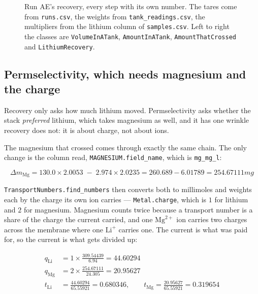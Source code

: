 \begin{figure}[htbp]
\caption{Run AE's recovery, every step with its own number. The tares come from
\texttt{runs.csv}, the weights from \texttt{tank\_readings.csv}, the multipliers from the
lithium column of \texttt{samples.csv}. Left to right the classes are
\texttt{VolumeInATank}, \texttt{AmountInATank}, \texttt{AmountThatCrossed} and
\texttt{LithiumRecovery}.}
\label{fig:ae-recovery-chain}
\end{figure}

\subsection{Permselectivity, which needs magnesium and the charge}

Recovery only asks how much lithium moved. Permselectivity asks whether the stack
\emph{preferred} lithium, which takes magnesium as well, and it has one wrinkle recovery does
not: it is about charge, not about ions.

The magnesium that crossed comes through exactly the same chain. The only change is the
column read, \texttt{MAGNESIUM.field\_name}, which is \texttt{mg\_mg\_l}:

\begin{equation}
  \Delta m_{\mathrm{Mg}} = 130.0 \times 2.0053 \;-\; 2.974 \times 2.0235
  = 260.689 - 6.01789 = 254.67111\unit{mg}
  \label{eq:crossed-mg}
\end{equation}

\texttt{TransportNumbers.find\_numbers} then converts both to millimoles and weights each by
the charge its own ion carries --- \texttt{Metal.charge}, which is $1$ for lithium and $2$ for
magnesium. Magnesium counts twice because a transport number is a share of the charge the
current carried, and one $\mathrm{Mg}^{2+}$ ion carries two charges across the membrane where
one $\mathrm{Li}^{+}$ carries one. The current is what was paid for, so the current is what
gets divided up:

\begin{align}
  q_{\mathrm{Li}} &= 1 \times \frac{309.54439}{6.94}   = 44.60294 \label{eq:q-li} \\
  q_{\mathrm{Mg}} &= 2 \times \frac{254.67111}{24.305} = 20.95627 \label{eq:q-mg} \\
  t_{\mathrm{Li}} &= \frac{44.60294}{65.55921} = 0.680346,
  \qquad t_{\mathrm{Mg}} = \frac{20.95627}{65.55921} = 0.319654 \label{eq:transport}
\end{align}


